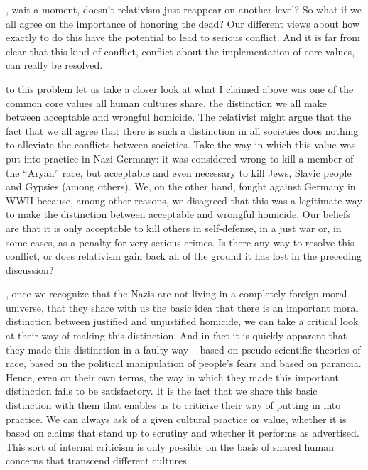 \documentclass[justified]{tufte-book}
\begin{document}
, wait a moment, doesn't relativism just reappear on another level? So what if we all agree on the importance of honoring the dead? Our different views about how exactly to do this have the potential to lead to serious conflict. And it is far from clear that this kind of conflict, conflict about the implementation of core values, can really be resolved.

 to this problem let us take a closer look at what I claimed above was one of the common core values all human cultures share, the distinction we all make between acceptable and wrongful homicide. The relativist might argue that the fact that we all agree that there is such a distinction in all societies does nothing to alleviate the conflicts between societies. Take the way in which this value was put into practice in Nazi Germany: it was considered wrong to kill a member of the ``Aryan'' race, but acceptable and even necessary to kill Jews, Slavic people and Gypsies (among others). We, on the other hand, fought against Germany in WWII because, among other reasons, we disagreed that this was a legitimate way to make the distinction between acceptable and wrongful homicide. Our beliefs are that it is only acceptable to kill others in self-defense, in a just war or, in some cases, as a penalty for very serious crimes. Is there any way to resolve this conflict, or does relativism gain back all of the ground it has lost in the preceding discussion?

, once we recognize that the Nazis are not living in a completely foreign moral universe, that they share with us the basic idea that there is an important moral distinction between justified and unjustified homicide, we can take a critical look at their way of making this distinction. And in fact it is quickly apparent that they made this distinction in a faulty way -- based on pseudo-scientific theories of race, based on the political manipulation of people's fears and based on paranoia. Hence, even on their own terms, the way in which they made this important distinction fails to be satisfactory. It is the fact that we share this basic distinction with them that enables us to criticize their way of putting in into practice. We can always ask of a given cultural practice or value, whether it is based on claims that stand up to scrutiny and whether it performs as advertised. This sort of internal criticism is only possible on the basis of shared human concerns that transcend different cultures.
\end{document}
